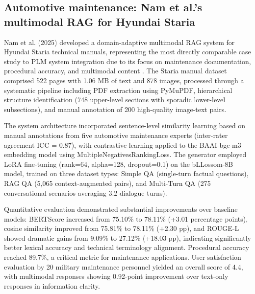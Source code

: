 \subsection{Automotive maintenance: Nam et al.'s multimodal RAG for Hyundai Staria}

Nam et al. (2025) developed a domain-adaptive multimodal RAG system for Hyundai Staria technical manuals, representing the most directly comparable case study to PLM system integration due to its focus on maintenance documentation, procedural accuracy, and multimodal content \parencite{nam_lora-tuned_2025}. The Staria manual dataset comprised 522 pages with 1.06 MB of text and 878 images, processed through a systematic pipeline including PDF extraction using PyMuPDF, hierarchical structure identification (748 upper-level sections with sporadic lower-level subsections), and manual annotation of 200 high-quality image-text pairs.

The system architecture incorporated sentence-level similarity learning based on manual annotations from five automotive maintenance experts (inter-rater agreement ICC = 0.87), with contrastive learning applied to the BAAI-bge-m3 embedding model using MultipleNegativesRankingLoss. The generator employed LoRA fine-tuning (rank=64, alpha=128, dropout=0.1) on the bLLossom-8B model, trained on three dataset types: Simple QA (single-turn factual questions), RAG QA (5,065 context-augmented pairs), and Multi-Turn QA (275 conversational scenarios averaging 3.2 dialogue turns).

Quantitative evaluation demonstrated substantial improvements over baseline models: BERTScore increased from 75.10\% to 78.11\% (+3.01 percentage points), cosine similarity improved from 75.81\% to 78.11\% (+2.30 pp), and ROUGE-L showed dramatic gains from 9.09\% to 27.12\% (+18.03 pp), indicating significantly better lexical accuracy and technical terminology alignment. Procedural accuracy reached 89.7\%, a critical metric for maintenance applications. User satisfaction evaluation by 20 military maintenance personnel yielded an overall score of 4.4, with multimodal responses showing 0.92-point improvement over text-only responses in information clarity.

